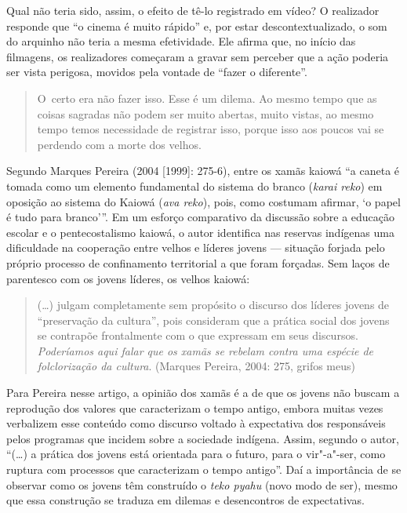 Qual não teria sido, assim, o efeito de tê-lo registrado em vídeo? O
realizador responde que ``o cinema é muito rápido'' e, por estar
descontextualizado, o som do arquinho não teria a mesma efetividade.
Ele afirma que, no início das filmagens, os realizadores começaram a
gravar sem perceber que a ação poderia ser vista perigosa, movidos pela
vontade de ``fazer o diferente''.

\begin{quote}
O~certo era não fazer isso. Esse é um dilema. Ao mesmo tempo que as
coisas sagradas não podem ser muito abertas, muito vistas, ao mesmo
tempo temos necessidade de registrar isso, porque isso aos poucos vai
se perdendo com a morte dos velhos.
\end{quote}

Segundo Marques Pereira (2004 [1999]: 275-6), entre os xamãs kaiowá ``a
caneta é tomada como um elemento fundamental do sistema do branco
(\emph{karai reko}) em oposição ao sistema do Kaiowá (\emph{ava reko}), pois, como
costumam afirmar, ‘o papel é tudo para branco’''. Em um esforço
comparativo da discussão sobre a educação escolar e o pentecostalismo
kaiowá, o autor identifica nas reservas indígenas uma dificuldade na
cooperação entre velhos e líderes jovens --- situação forjada pelo
próprio processo de confinamento territorial a que foram forçadas. Sem
laços de parentesco com os jovens líderes, os velhos kaiowá:

\begin{quote}
(\ldots{}) julgam completamente sem propósito o discurso dos líderes jovens
de ``preservação da cultura'', pois
consideram que a prática social dos jovens se contrapõe frontalmente
com o que expressam em seus discursos. \emph{Poderíamos aqui falar que os
xamãs se rebelam contra uma espécie de folclorização da cultura}.
(Marques Pereira, 2004: 275, grifos meus)
\end{quote}

Para Pereira nesse artigo, a opinião dos xamãs é a de que os jovens não
buscam a reprodução dos valores que caracterizam o tempo antigo, embora
muitas vezes verbalizem esse conteúdo como discurso voltado à
expectativa dos responsáveis pelos programas que incidem sobre a
sociedade indígena. Assim, segundo o autor, ``(\ldots{}) a prática dos jovens
está orientada para o futuro, para o vir"-a"-ser, como ruptura com
processos que caracterizam o tempo antigo''. Daí a importância de se
observar como os jovens têm construído o \emph{teko pyahu} (novo modo de ser),
mesmo que essa construção se traduza em dilemas e desencontros de
expectativas.

